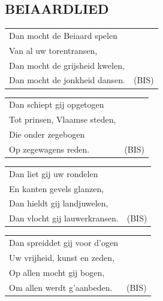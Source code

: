 \documentclass[a4paper, 14pt]{extarticle}
\begin{document}
\subsection*{BEIAARDLIED}
\begin{flushleft}
\begin{tabularx}{0.8\textwidth} {
   >{\raggedright\arraybackslash}X c}
   Dan mocht de Beiaard spelen\\
Van al uw torentransen,\\
Dan mocht de grijsheid kwelen,\\
Dan mocht de jonkheid dansen. & (BIS)\\
\end{tabularx}
\end{flushleft}\begin{flushleft}
\begin{tabularx}{0.8\textwidth} {
   >{\raggedright\arraybackslash}X c}
   Dan schiept gij opgetogen\\
Tot prinsen, Vlaamse steden,\\
Die onder zegebogen\\
Op zegewagens reden. & (BIS)\\
\end{tabularx}
\end{flushleft}\begin{flushleft}
\begin{tabularx}{0.8\textwidth} {
   >{\raggedright\arraybackslash}X c }
   Dan liet gij uw rondelen\\
En kanten gevels glanzen,\\
Dan hieldt gij landjuwelen,\\
Dan vlocht gij lauwerkransen. & (BIS)\\
\end{tabularx}
\end{flushleft}\begin{flushleft}
\begin{tabularx}{0.8\textwidth} {
   >{\raggedright\arraybackslash}X c}
   Dan spreiddet gij voor d’ogen\\
Uw vrijheid, kunst en zeden,\\
Op allen mocht gij bogen,\\
Om allen werdt g’aanbeden. & (BIS)\\
\end{tabularx}
\end{flushleft}
\end{document}
